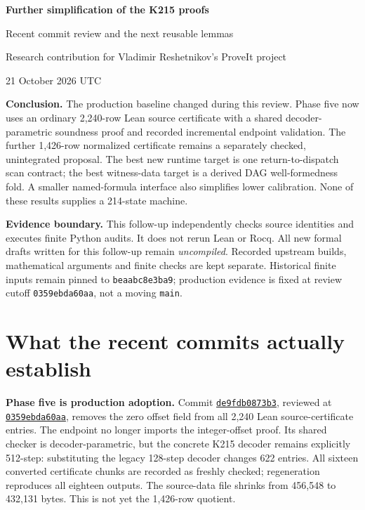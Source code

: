 \documentclass[11pt]{article}
\newcommand{\code}[1]{\texttt{#1}}
\newcommand{\repo}{https://github.com/VladimirReshetnikov/ProveIt}
\begin{document}
\begin{center}
{\LARGE\bfseries Further simplification of the K215 proofs}\par\vspace{7pt}
{\large Recent commit review and the next reusable lemmas}\par\vspace{5pt}
{Research contribution for Vladimir Reshetnikov's ProveIt project}\par
{21 October 2026 UTC}
\end{center}

\textbf{Conclusion.} The production baseline changed during this review. Phase five now uses an ordinary 2,240-row Lean source certificate with a shared decoder-parametric soundness proof and recorded incremental endpoint validation. The further 1,426-row normalized certificate remains a separately checked, unintegrated proposal. The best new runtime target is one return-to-dispatch scan contract; the best witness-data target is a derived DAG well-formedness fold. A smaller named-formula interface also simplifies lower calibration. None of these results supplies a 214-state machine.

\textbf{Evidence boundary.} This follow-up independently checks source identities and executes finite Python audits. It does not rerun Lean or Rocq. All new formal drafts written for this follow-up remain \emph{uncompiled}. Recorded upstream builds, mathematical arguments and finite checks are kept separate. Historical finite inputs remain pinned to \code{beaabc8e3ba9}; production evidence is fixed at review cutoff \code{0359ebda60aa}, not a moving \code{main}.

\section{What the recent commits actually establish}
\textbf{Phase five is production adoption.} Commit
\href{\repo/commit/de9fdb0873b36d049d075a5c0568f2dfcff28e7a}{\code{de9fdb0873b3}},
reviewed at \href{\repo/commit/0359ebda60aaf52758358e1450a04988136db67e}{\code{0359ebda60aa}},
removes the zero offset field from all 2,240 Lean source-certificate entries. The endpoint no longer imports the integer-offset proof. Its shared checker is decoder-parametric, but the concrete K215 decoder remains explicitly 512-step: substituting the legacy 128-step decoder changes 622 entries. All sixteen converted certificate chunks are recorded as freshly checked; regeneration reproduces all eighteen outputs. The source-data file shrinks from 456,548 to 432,131 bytes. This is not yet the 1,426-row quotient.
\end{document}
